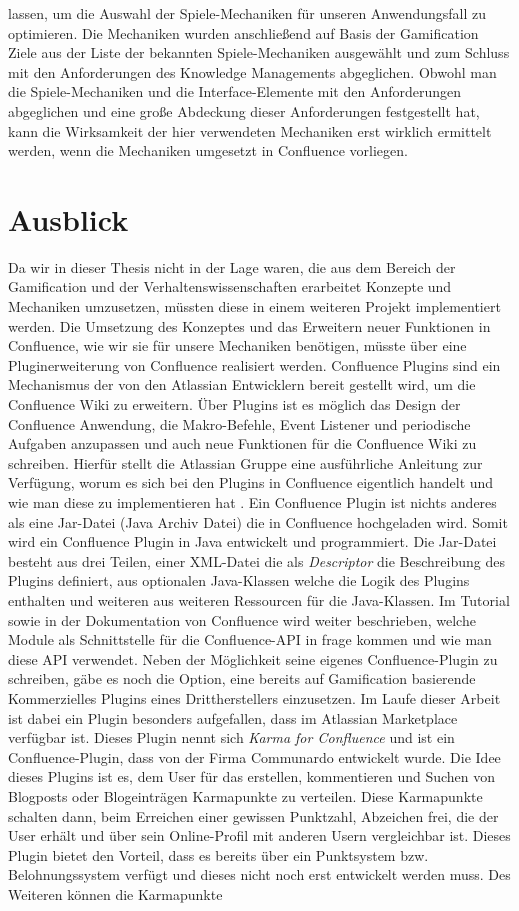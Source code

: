 \documentclass[a4paper,12pt,twoside]{scrartcl}
\begin{document}
lassen, um die Auswahl der Spiele-Mechaniken für unseren Anwendungsfall zu optimieren. Die Mechaniken wurden anschließend auf Basis der Gamification Ziele aus der Liste der bekannten Spiele-Mechaniken ausgewählt und zum Schluss mit den Anforderungen des Knowledge Managements abgeglichen. Obwohl man die Spiele-Mechaniken und die Interface-Elemente mit den Anforderungen abgeglichen und eine große Abdeckung dieser Anforderungen festgestellt hat, kann die Wirksamkeit der hier verwendeten Mechaniken erst wirklich ermittelt werden, wenn die Mechaniken umgesetzt in Confluence vorliegen. 
\newpage
\section{Ausblick}
Da wir in dieser Thesis nicht in der Lage waren, die aus dem Bereich der Gamification und der Verhaltenswissenschaften erarbeitet Konzepte und Mechaniken umzusetzen, müssten diese in einem weiteren Projekt implementiert werden. Die Umsetzung des Konzeptes und das Erweitern neuer Funktionen in Confluence, wie wir sie für unsere Mechaniken benötigen, müsste über eine Pluginerweiterung von Confluence realisiert werden. Confluence Plugins sind ein Mechanismus der von den Atlassian Entwicklern bereit gestellt wird, um die Confluence Wiki zu erweitern. Über Plugins ist es möglich das Design der Confluence Anwendung, die Makro-Befehle, Event Listener und periodische Aufgaben anzupassen und auch neue Funktionen für die Confluence Wiki zu schreiben. Hierfür stellt die Atlassian Gruppe eine ausführliche Anleitung zur Verfügung, worum es sich bei den Plugins in Confluence eigentlich handelt und wie man diese zu implementieren hat \cite{Plugins17}. Ein Confluence Plugin ist nichts anderes als eine Jar-Datei (Java Archiv Datei) die in Confluence hochgeladen wird. Somit wird ein Confluence Plugin in Java entwickelt und programmiert. Die Jar-Datei besteht aus drei Teilen, einer XML-Datei die als \textit{Descriptor} die Beschreibung des Plugins definiert, aus optionalen Java-Klassen welche die Logik des Plugins enthalten und weiteren aus weiteren Ressourcen für die Java-Klassen. Im Tutorial sowie in der Dokumentation von Confluence wird weiter beschrieben, welche Module als Schnittstelle für die Confluence-API in frage kommen und wie man diese API verwendet. Neben der Möglichkeit seine eigenes Confluence-Plugin zu schreiben, gäbe es noch die Option, eine bereits auf Gamification basierende Kommerzielles Plugins eines Drittherstellers einzusetzen. Im Laufe dieser Arbeit ist dabei ein Plugin besonders aufgefallen, dass im Atlassian Marketplace verfügbar ist. Dieses Plugin nennt sich \textit{Karma for Confluence} und ist ein Confluence-Plugin, dass von der Firma Communardo entwickelt wurde. Die Idee dieses Plugins ist es, dem User für das erstellen, kommentieren und Suchen von Blogposts oder Blogeinträgen Karmapunkte zu verteilen. Diese Karmapunkte schalten dann, beim Erreichen einer gewissen Punktzahl, Abzeichen frei, die der User erhält und über sein Online-Profil mit anderen Usern vergleichbar ist. Dieses Plugin bietet den Vorteil, dass es bereits über ein Punktsystem bzw. Belohnungssystem verfügt und dieses nicht noch erst entwickelt werden muss. Des Weiteren können die Karmapunkte 
\end{document}
